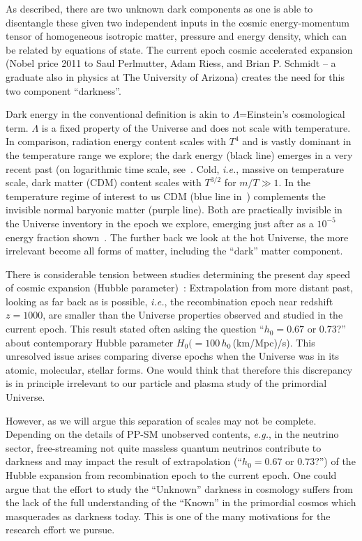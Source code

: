 As described, there are two unknown dark components as one is able to disentangle these given two independent inputs in the cosmic energy-momentum tensor of homogeneous isotropic matter, pressure and energy density, which can be related by equations of state. The current epoch cosmic accelerated expansion (Nobel price 2011 to Saul Perlmutter, Adam Riess, and Brian P. Schmidt -- a graduate also in physics at The University of Arizona) creates the need for this two component ``darkness''.

Dark energy in the conventional definition is akin to $\Lambda$=Einstein's cosmological term. $\Lambda$ is a fixed property of the Universe and does not scale with temperature. In comparison, radiation energy content scales with $T^4$ and is vastly dominant in the temperature range we explore; the dark energy (black line) emerges in a very recent past (on logarithmic time scale, see~. Cold, {\it i.e.\/}, massive on temperature scale,  dark matter (CDM) content scales with $T^{3/2}$ for $m/T\gg 1$. In the temperature regime of interest to us CDM (blue line in~) complements the invisible normal baryonic matter (purple line). Both are practically invisible in the Universe inventory in the epoch we explore, emerging just after as a $10^{-5}$ energy fraction shown~. The further back we look at the hot Universe, the more irrelevant become all forms of matter, including the ``dark'' matter component. 

There is considerable tension between studies determining the present day speed of cosmic expansion (Hubble parameter)~\cite{DiValentino:2024spr,DiValentino:2021izs}: Extrapolation from more distant past, looking as far back as is possible, {\it i.e.\/}, the recombination epoch near redshift $z=1000$, are smaller than the Universe properties observed and studied in the current epoch. This result stated often asking the question ``$h_0=0.67$ or $0.73$?'' about contemporary Hubble parameter $H_0(=100\,h_0$\,(km/Mpc)/s). This unresolved issue arises comparing diverse epochs when the Universe was in its atomic, molecular, stellar forms. One would think that therefore this discrepancy is in principle irrelevant to our particle and plasma study of the primordial Universe. 

However, as we will argue this separation of scales may not be complete. Depending on the details of PP-SM unobserved contents, {\it e.g.\/}, in the neutrino sector, free-streaming not quite massless quantum neutrinos contribute to darkness and may impact the result of extrapolation (``$h_0=0.67$ or $0.73$?'') of the Hubble expansion from recombination epoch to the current epoch. One could argue that the effort to study the ``Unknown'' darkness in cosmology suffers from the lack of the full understanding of the ``Known'' in the primordial cosmos which masquerades as darkness today. This is one of the many motivations for the research effort we pursue. 

